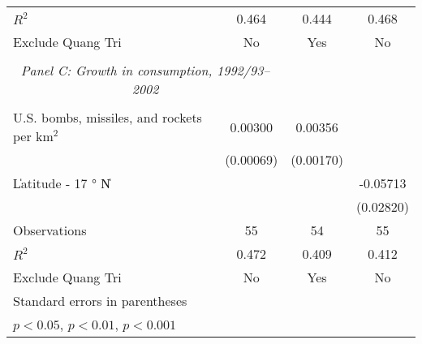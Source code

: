 \begin{table}[htbp]
\begin{tabular}{l*{3}{c}}
\(R^{2}\)           &       0.464         &       0.444         &       0.468         \\
Exclude Quang Tri   &          No         &         Yes         &          No         \\
\hline \\ \multicolumn{2}{c}{\emph{Panel C: Growth in consumption, 1992/93–2002}} \\\\[-1ex]
U.S. bombs, missiles, and rockets per km$^2$&     0.00300\sym{***}&     0.00356\sym{*}  &                     \\
                    &   (0.00069)         &   (0.00170)         &                     \\
[1em]
\|Latitude - 17 $°$ N\|&                     &                     &    -0.05713\sym{*}  \\
                    &                     &                     &   (0.02820)         \\
\hline
Observations        &          55         &          54         &          55         \\
\(R^{2}\)           &       0.472         &       0.409         &       0.412         \\
Exclude Quang Tri   &          No         &         Yes         &          No         \\
\hline\hline \multicolumn{5}{l}{\footnotesize Standard errors in parentheses}\\\multicolumn{3}{l}{\footnotesize \sym{*} \(p<0.05\), \sym{**} \(p<0.01\), \sym{***} \(p<0.001\)}\\ \end{tabular} \\ \end{table}
